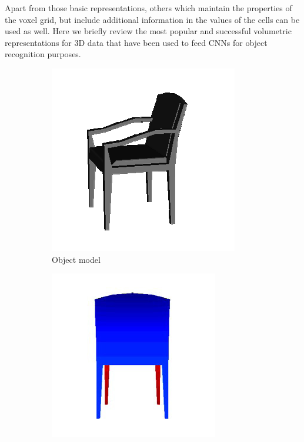 Apart from those basic representations, others which maintain the properties of the voxel grid, but include additional information in the values of the cells can be used as well. Here we briefly review the most popular and successful volumetric representations for \acs{3D} data that have been used to feed \acp{CNN} for object recognition purposes.

\begin{figure}[!b]
	\centering
	\hfill
	\begin{subfigure}{0.32\textwidth}
		\centering
		\includegraphics[width=\linewidth]{Figures/ObjRecog/chair_model}
		\caption{Object model}
		\label{subfig:objrecog:3dshapenets:model}
	\end{subfigure}
	\hfill
	\begin{subfigure}{0.32\textwidth}
		\centering
		\includegraphics[width=\linewidth]{Figures/ObjRecog/chair_view}

\end{subfigure}
\end{figure}
